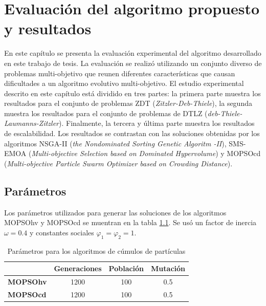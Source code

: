 
\chapter{Evaluaci\'on del algoritmo propuesto y resultados}

En este cap\'itulo se presenta la evaluaci\'on experimental del algoritmo desarrollado en este trabajo de tesis. 
La evaluaci\'on se realiz\'o utilizando un conjunto diverso de problemas multi-objetivo que reunen diferentes caracter\'isticas que causan 
dificultades a un algoritmo evolutivo multi-objetivo. El estudio experimental descrito en este cap\'itulo est\'a dividido 
en tres partes: la primera parte muestra los resultados para el conjunto de problemas ZDT (\textit{Zitzler-Deb-Thiele}), 
la segunda muestra los resultados para el conjunto de problemas de DTLZ (\textit{deb-Thiele-Laumanns-Zitzler}). 
Finalmente, la tercera y \'ultima parte muestra los resultados de escalabilidad. Los resultados se contrastan 
con las soluciones obtenidas por los algoritmos NSGA-II (\textit{the Nondominated Sorting Genetic Algoritm -II}), SMS-EMOA 
(\textit{Multi-objective Selection based on Dominated Hypervolume}) y MOPSOcd (\textit{Multi-objective Particle Swarm Optimizer based on 
Crowding Distance}).
  
  \section*{Par\'ametros}
  
  Los par\'ametros utilizados para generar las soluciones de los algoritmos MOPSOhv y MOPSOcd se muentran en la tabla
  \ref{tab:parametros1}. Se us\'o un factor de 
  inercia $\omega = 0.4$ y constantes sociales $\varphi_{1}=\varphi_{2}=1$.
 
 \begin{table}[H]
  \begin{center}
    \begin{tabular}{|l||c|c|c|}
	\hline
	& \textbf{Generaciones}  & \textbf{Poblaci\'on} & \textbf{Mutaci\'on} \\
	\hline
	\hline
	\textbf{MOPSOhv} & 1200 & 100 &0.5\\ 
	\hline
	\textbf{MOPSOcd} & 1200 & 100 &0.5\\
	\hline
	\end{tabular}
	\caption{Par\'ametros para los algoritmos de c\'umulos de part\'iculas}
  \label{tab:parametros1}
  \end{center}
\end{table}

